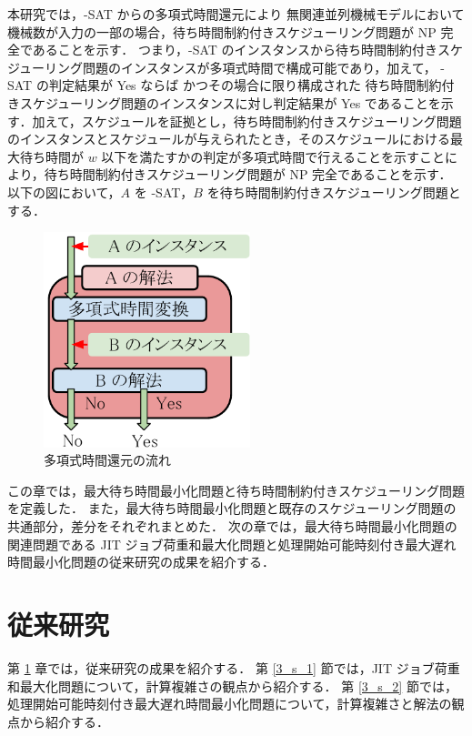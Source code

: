 \documentclass[12pt]{optlab-bachelor}
\begin{document}
本研究では，{-SAT} からの多項式時間還元により 無関連並列機械モデルにおいて機械数が入力の一部の場合，待ち時間制約付きスケジューリング問題が NP 完全であることを示す．
つまり，{-SAT} のインスタンスから待ち時間制約付きスケジューリング問題のインスタンスが多項式時間で構成可能であり，加えて， {-SAT}  の判定結果が Yes ならば
かつその場合に限り構成された 待ち時間制約付きスケジューリング問題のインスタンスに対し判定結果が Yes であることを示す．加えて，スケジュールを証拠とし，待ち時間制約付きスケジューリング問題のインスタンスとスケジュールが与えられたとき，そのスケジュールにおける最大待ち時間が $w$ 以下を満たすかの判定が多項式時間で行えることを示すことにより，待ち時間制約付きスケジューリング問題が NP 完全であることを示す．
以下の図において，$A$ を {-SAT}，$B$ を待ち時間制約付きスケジューリング問題とする．

\begin{figure}[h]
  \centering
  \includegraphics[width = 6cm]{figure/reduction.pdf}
  \caption{多項式時間還元の流れ}
\end{figure}

この章では，最大待ち時間最小化問題と待ち時間制約付きスケジューリング問題を定義した．
また，最大待ち時間最小化問題と既存のスケジューリング問題の共通部分，差分をそれぞれまとめた．
次の章では，最大待ち時間最小化問題の関連問題である JIT ジョブ荷重和最大化問題と処理開始可能時刻付き最大遅れ時間最小化問題の従来研究の成果を紹介する．

\chapter{従来研究}\label{c_3}
第 \ref{c_3} 章では，従来研究の成果を紹介する．
第 \ref{3_s_1} 節では，JIT ジョブ荷重和最大化問題について，計算複雑さの観点から紹介する．
第 \ref{3_s_2} 節では，処理開始可能時刻付き最大遅れ時間最小化問題について，計算複雑さと解法の観点から紹介する．
\end{document}

